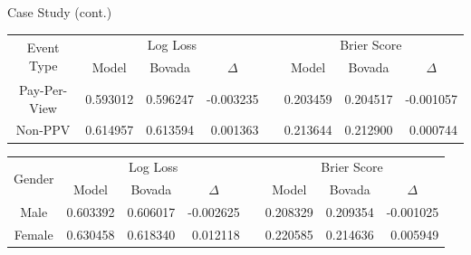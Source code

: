 \documentclass[aspectratio=169,xcolor=dvipsnames]{beamer}
\begin{document}

\begin{frame}{Case Study (cont.)}
    \tiny
    \begin{table}[!htb]
    \centering
    \begin{tabular}{@{}cccrcccr@{}}
    \toprule
    \multirow{2}{*}{Event Type} & \multicolumn{3}{c}{Log Loss}                       & \multirow{2}{*}{} & \multicolumn{3}{c}{Brier Score}                    \\ \cmidrule(lr){2-4} \cmidrule(l){6-8} 
                            & Model    & Bovada   & \multicolumn{1}{c}{$\Delta$} &                   & Model    & Bovada   & \multicolumn{1}{c}{$\Delta$} \\ \midrule
    Pay-Per-View            & 0.593012 & 0.596247 & -0.003235                    &                   & 0.203459 & 0.204517 & -0.001057                    \\
    Non-PPV             & 0.614957 & 0.613594 & 0.001363                     &                   & 0.213644 & 0.212900 & 0.000744                     \\ \bottomrule
    \end{tabular}
    \normalsize
    \end{table}

    \tiny
    \begin{table}[!htb]
    \centering
    \begin{tabular}{@{}cccrcccr@{}}
    \toprule
    \multirow{2}{*}{Gender} & \multicolumn{3}{c}{Log Loss}                       & \multirow{2}{*}{} & \multicolumn{3}{c}{Brier Score}                    \\ \cmidrule(lr){2-4} \cmidrule(l){6-8} 
                            & Model    & Bovada   & \multicolumn{1}{c}{$\Delta$} &                   & Model    & Bovada   & \multicolumn{1}{c}{$\Delta$} \\ \midrule
    Male                    & 0.603392 & 0.606017 & -0.002625                    &                   & 0.208329 & 0.209354 & -0.001025                    \\
    Female                  & 0.630458 & 0.618340 & 0.012118                     &                   & 0.220585 & 0.214636 & 0.005949                     \\ \bottomrule
    \end{tabular}
    \normalsize
    \end{table}


\end{frame}
\end{document}
